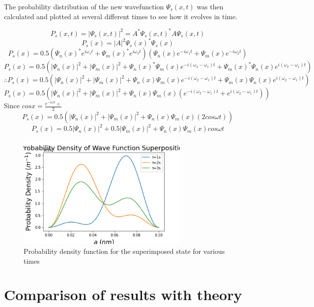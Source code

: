 The probability distribution of the new wavefunction $\Psi_s(x,t)$ was then calculated and plotted at several different times to see how it evolves in time.

$$P_s(x, t) = |\Psi_s(x, t)|^{2} = A^{*} \Psi_s (x, t)^{*} A\Psi_s (x, t)$$
$$P_s(x) = \left | A \right |^2 \Psi_s (x)^{*} \Psi_s (x)$$
$$P_s(x) = 0.5 (\Psi_n (x)^{*}e^{i \omega_{1} t} + \Psi_m (x)^{*}e^{i \omega_{2} t}) (\Psi_n (x)e^{-i \omega_{1} t} + \Psi_m (x)e^{-i \omega_{2} t})$$
$$P_s(x) = 0.5 (\left | \Psi_n (x) \right |^2 + \left | \Psi_m (x) \right |^2 + \Psi_n (x)^{*}\Psi_m (x)e^{-i(\omega_{2}- \omega_{1}) t} + \Psi_m (x)^{*}\Psi_n (x)e^{i(\omega_{2}- \omega_{1}) t})$$
$$\therefore P_s(x) =  0.5 (\left | \Psi_n (x) \right |^2 + \left | \Psi_m (x) \right |^2 + \Psi_n (x)\Psi_m (x)e^{-i(\omega_{2}- \omega_{1}) t} + \Psi_m (x)\Psi_n (x)e^{i(\omega_{2}- \omega_{1}) t})$$
$$P_s(x) = 0.5 (\left | \Psi_n (x) \right |^2 + \left | \Psi_m (x) \right |^2 + \Psi_n (x)\Psi_m (x)(e^{-i(\omega_{2}- \omega_{1}) t} + e^{i(\omega_{2}- \omega_{1}) t}))$$
Since $cosx=\frac{e^{-i\omega x}+}{2}$ 
$$P_s(x) = 0.5 (\left | \Psi_n (x) \right |^2 + \left | \Psi_m (x) \right |^2 + \Psi_n (x)\Psi_m (x)(2cos\omega t))$$
$$P_s(x) = 0.5 \left | \Psi_n (x) \right |^2 + 0.5\left | \Psi_m (x) \right |^2 + \Psi_n (x)\Psi_m (x)cos\omega t$$

\begin{figure}[h]
    \centering
    \includegraphics[width=0.75\textwidth]{lab1/images/superpositionPDF.png}
    \caption{Probability density function for the superimposed state for various times}
    \label{fig:superPosPDF}
\end{figure}

\section{Comparison of results with theory}

